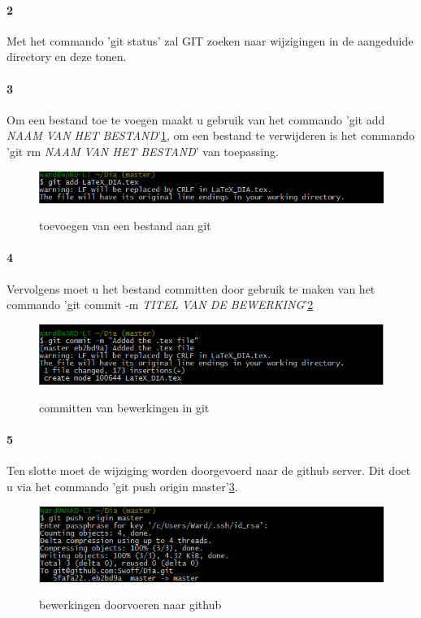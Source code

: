 \documentclass[12pt,a4paper]{report}
\begin{document}
\begin{flushleft}
\paragraph*{2}
Met het commando 'git status' zal GIT zoeken naar wijzigingen in de aangeduide directory en deze tonen.
\paragraph*{3}
Om een bestand toe te voegen maakt u gebruik van het commando 'git add  \textit{NAAM VAN HET BESTAND}'\ref{git_01}, om een bestand te verwijderen is het commando 'git rm \emph{NAAM VAN HET BESTAND}' van toepassing.
\begin{figure}[H]
\includegraphics[scale=0.75]{images/git_01.png}
\label{git_01}
\centering 
\vspace{-10pt}
\caption{toevoegen van een bestand aan git}
\end{figure} 
\paragraph*{4}
Vervolgens moet u het bestand committen door gebruik te maken van het commando 'git commit  -m \textit{TITEL VAN DE BEWERKING}'\ref{git_02}
\begin{figure}[H]
\includegraphics[scale=0.75]{images/git_02.png}
\label{git_02}
\centering 
\vspace{-10pt}
\caption{committen van bewerkingen in git}
\end{figure}  
\paragraph*{5}
Ten slotte moet de wijziging worden doorgevoerd naar de github server. Dit doet u via het commando 'git push origin master'\ref{git_03}.
\begin{figure}[H]
\includegraphics[scale=0.75]{images/git_03.png}
\label{git_03}
\centering 
\vspace{-10pt}
\caption{bewerkingen doorvoeren naar github}
\end{figure} 

\end{flushleft}
\end{document}

